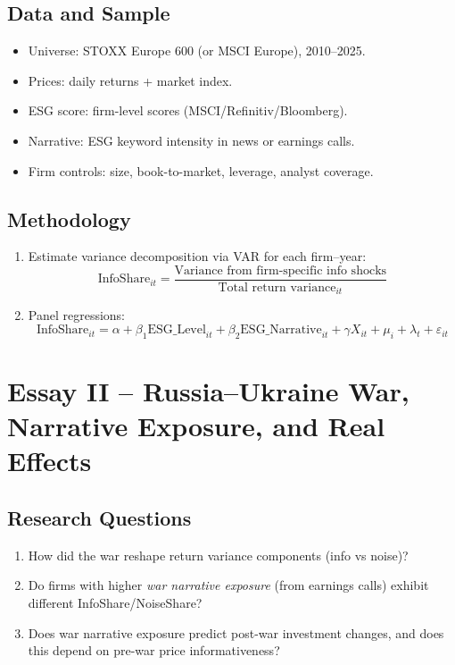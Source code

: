 \documentclass[12pt]{article}
\begin{document}
\subsection*{Data and Sample}
\begin{itemize}[leftmargin=*]
  \item Universe: STOXX Europe 600 (or MSCI Europe), 2010--2025.
  \item Prices: daily returns + market index.
  \item ESG score: firm-level scores (MSCI/Refinitiv/Bloomberg).
  \item Narrative: ESG keyword intensity in news or earnings calls.
  \item Firm controls: size, book-to-market, leverage, analyst coverage.
\end{itemize}

\subsection*{Methodology}
\begin{enumerate}[leftmargin=*]
  \item Estimate variance decomposition via VAR for each firm--year:
    \[
    \text{InfoShare}_{it} = \frac{\text{Variance from firm-specific info shocks}}{\text{Total return variance}_{it}}
    \]
  \item Panel regressions:
    \[
    \text{InfoShare}_{it} = \alpha + \beta_1 \text{ESG\_Level}_{it} + \beta_2 \text{ESG\_Narrative}_{it} + \gamma X_{it} + \mu_i + \lambda_t + \varepsilon_{it}
    \]
\end{enumerate}

\vspace{0.5em}
\section*{Essay II -- Russia--Ukraine War, Narrative Exposure, and Real Effects}

\subsection*{Research Questions}
\begin{enumerate}[leftmargin=*,label={\arabic*.}]
  \item How did the war reshape return variance components (info vs noise)?
  \item Do firms with higher \emph{war narrative exposure} (from earnings calls) exhibit different InfoShare/NoiseShare?
  \item Does war narrative exposure predict post-war investment changes, and does this depend on pre-war price informativeness?
\end{enumerate}
\end{document}

